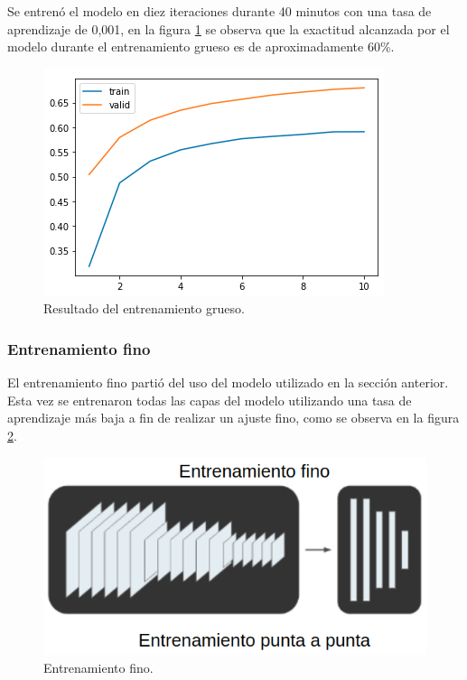 Se entrenó el modelo en diez iteraciones durante 40 minutos con una tasa de aprendizaje de 0,001, en la figura \ref{fig:entrenamientoGruesoResultado} se observa que la exactitud alcanzada por el modelo durante el entrenamiento grueso es de aproximadamente 60\%.

\begin{figure}[ht]
	\centering
	\includegraphics[scale=1.]{./Figures/entrenamientoGruesoResultado.png}
	\caption{Resultado del entrenamiento grueso.}
	\label{fig:entrenamientoGruesoResultado}
\end{figure}

\newpage

\subsubsection{Entrenamiento fino}

El entrenamiento fino partió del uso del modelo utilizado en la sección anterior. Esta vez se entrenaron todas las capas del modelo utilizando una tasa de aprendizaje más baja a fin de realizar un ajuste fino, como se observa en la figura \ref{fig:entrenamientoFino}.

\begin{figure}[ht]
	\centering
	\includegraphics[scale=.60]{./Figures/entrenamientoFino.png}
	\caption{Entrenamiento fino.}
	\label{fig:entrenamientoFino}
\end{figure}

